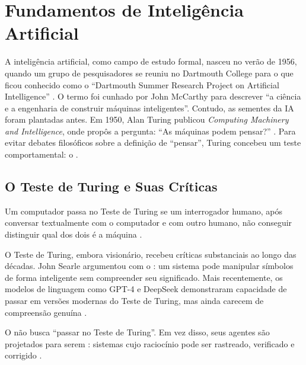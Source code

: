 \section{Fundamentos de Inteligência Artificial}
\label{sec:fundamentos-ia}
\nivelzero
A inteligência artificial, como campo de estudo formal, nasceu no verão de
1956, quando um grupo de pesquisadores se reuniu no Dartmouth College para o
que ficou conhecido como o ``Dartmouth Summer Research Project on Artificial
Intelligence'' \cite{mccarthy1955proposal}. O termo  foi cunhado por John McCarthy para descrever ``a ciência e a
engenharia de construir máquinas inteligentes''.
Contudo, as sementes da IA foram plantadas antes. Em 1950, Alan Turing
publicou \textit{Computing Machinery and Intelligence}, onde propôs a
pergunta: ``As máquinas podem pensar?'' \cite{turing1950computing}. Para
evitar debates filosóficos sobre a definição de ``pensar'', Turing concebeu
um teste comportamental: o .
\subsection{O Teste de Turing e Suas Críticas}
\begin{definicao}
Um computador passa no Teste de Turing se um interrogador humano, após
conversar textualmente com o computador e com outro humano, não conseguir
distinguir qual dos dois é a máquina \cite{turing1950computing}.
\end{definicao}
O Teste de Turing, embora visionário, recebeu críticas substanciais ao longo
das décadas. John Searle argumentou com o  \cite{russell2020inteligencia}: um sistema pode manipular símbolos
de forma inteligente sem compreender seu significado. Mais recentemente, os
modelos de linguagem como GPT-4 e DeepSeek demonstraram capacidade de
passar em versões modernas do Teste de Turing, mas ainda carecem de
compreensão genuína \cite{achiam2023gpt4, bender2021dangers}.
\begin{observacao}
O \opencodeeco{} não busca ``passar no Teste de Turing''. Em vez disso, seus
agentes são projetados para serem :
sistemas cujo raciocínio pode ser rastreado, verificado e corrigido
\cite{opencode2026ecosystem}.
\end{observacao}
